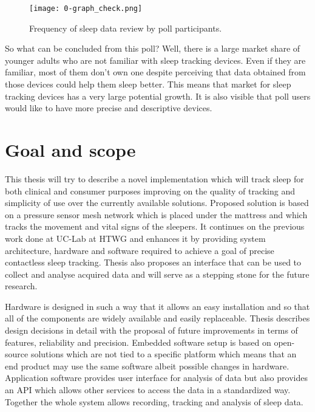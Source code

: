 \begin{figure}[h]
  \begin{center}
    \texttt{[image: 0-graph\_check.png]}
  \end{center}
  \caption{Frequency of sleep data review by poll participants.}
  \label{fig:check}
\end{figure}

So what can be concluded from this poll? Well, there is a large market share of younger adults who are not familiar with sleep tracking devices. Even if they are familiar, most of them don't own one despite perceiving that data obtained from those devices could help them sleep better. This means that market for sleep tracking devices has a very large potential growth. It is also visible that poll users would like to have more precise and descriptive devices.


\section{Goal and scope}

This thesis will try to describe a novel implementation which will track sleep for both clinical and consumer purposes improving on the quality of tracking and simplicity of use over the currently available solutions. Proposed solution is based on a pressure sensor mesh network which is placed under the mattress and which tracks the movement and vital signs of the sleepers. It continues on the previous work done at \ac{UC-Lab} at \ac{HTWG} and enhances it by providing system architecture, hardware and software required to achieve a goal of precise contactless sleep tracking. Thesis also proposes an interface that can be used to collect and analyse acquired data and will serve as a stepping stone for the future research.

Hardware is designed in such a way that it allows an easy installation and so that all of the components are widely available and easily replaceable. Thesis describes design decisions in detail with the proposal of future improvements in terms of features, reliability and precision. Embedded software setup is based on open-source solutions which are not tied to a specific platform which means that an end product may use the same software albeit possible changes in hardware. Application software provides user interface for analysis of data but also provides an \ac{API} which allows other services to access the data in a standardized way. Together the whole system allows recording, tracking and analysis of sleep data.

